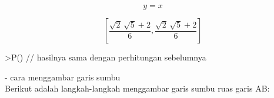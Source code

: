 \documentclass[a4paper,10pt]{article}
\begin{document}
\begin{eulernotebook}
\begin{eulercomment}
\begin{eulercomment}
\begin{eulercomment}
\begin{eulercomment}
\begin{eulerformula}
\[
y=x
\]
\end{eulerformula}
\begin{eulerformula}
\[
\left[ \frac{\sqrt{2}\,\sqrt{5}+2}{6} , \frac{\sqrt{2}\,\sqrt{5}+2
 }{6} \right] 
\]
\end{eulerformula}
\begin{eulerprompt}
>P() // hasilnya sama dengan perhitungan sebelumnya
\end{eulerprompt}
\begin{euleroutput}
  [0.86038,  0.86038]
\end{euleroutput}
\begin{eulercomment}
- cara menggambar garis sumbu\\
Berikut adalah langkah-langkah menggambar garis sumbu ruas garis AB:


\end{eulercomment}
\end{eulercomment}
\end{eulercomment}
\end{eulercomment}
\end{eulercomment}
\end{eulernotebook}
\end{document}
